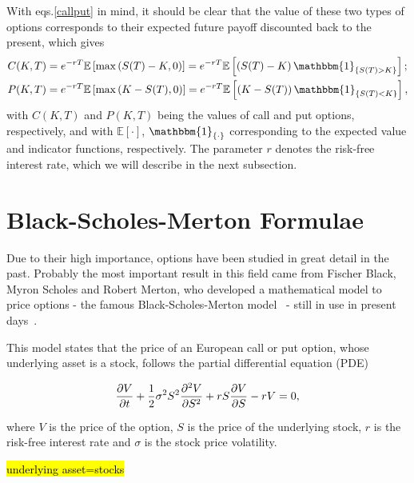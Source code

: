 With eqs.\eqref{callput} in mind, it should be clear that the value of these two types of options corresponds to their expected future payoff discounted back to the present, which gives
\begin{equation}
\begin{split}
&C(K,T)=e^{-rT}\mathbb{E}\left[\max\left(S(T)-K,0\right)\right]=e^{-rT}\mathbb{E}\left[\left(S(T)-K\right)\mathbbm{1}_{\left\{S(T)>K\right\}}\right];\\
&P(K,T)=e^{-rT}\mathbb{E}\left[\max\left(K-S(T),0\right)\right]=e^{-rT}\mathbb{E}\left[\left(K-S(T)\right)\mathbbm{1}_{\left\{S(T)<K\right\}}\right],
\end{split}
\end{equation}
\noindent with $C(K,T)$ and $P(K,T)$ being the values of call and put options, respectively, and with $\mathbb{E}[\cdot]$, $\mathbbm{1}_{\{\cdot\}}$ corresponding to the expected value and indicator functions, respectively. The parameter $r$ denotes the risk-free interest rate, which we will describe in the next subsection.




    
\section{Black-Scholes-Merton Formulae}
\label{section:Black-Scholes-Merton Formulae}
Due to their high importance, options have been studied in great detail in the past.
Probably the most important result in this field came from Fischer Black, Myron Scholes and Robert Merton, who developed a mathematical model to price options - the famous Black-Scholes-Merton model~\cite{Scholes} - still in use in present days~\cite{Wilmott3}.

This model states that the price of an European call or put option, whose underlying asset is a stock, follows the partial differential equation (PDE)

\begin{equation}\label{BS2}
\pdv{V}{t}+\frac{1}{2}\sigma^2S^2\pdv{^2V}{S^2}+rS\pdv{V}{S}-rV=0,
\end{equation}

\noindent where $V$ is the price of the option, $S$ is the price of the underlying stock, $r$ is the risk-free interest rate and $\sigma$ is the stock price volatility.

\hl{underlying asset=stocks}
 
